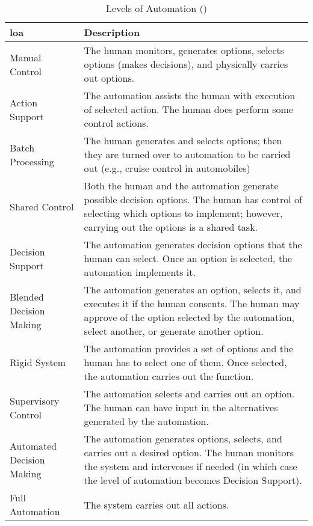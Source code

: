 \begin{table}\centering
  \caption[Levels of Automation]{Levels of Automation (\citet{Endsley1999})}
  \label{tab:autonomy_levels_endsley}
  \begin{tabularx}{\textwidth}{p{3cm} X}\toprule
    \gls{loa} & Description \\ \midrule
    Manual Control &
    The human monitors, generates options, selects options (makes decisions), and physically carries out options.\\
    Action Support &
    The automation assists the human with execution of selected action. The human does perform some control actions.\\
    Batch Processing &
    The human generates and selects options; then they are turned over to automation to be carried out (e.g., cruise control in automobiles)\\
    Shared Control &
    Both the human and the automation generate possible decision options. The human has control of selecting which options to implement; however, carrying out the options is a shared task.\\
    Decision Support &
    The automation generates decision options that the human can select. Once an option is selected, the automation implements it.\\
    Blended Decision Making & 
    The automation generates an option, selects it, and executes it if the human consents. The human may approve of the option selected by the automation, select another, or generate another option.\\
    Rigid System &      
    The automation provides a set of options and the human has to select one of them. Once selected, the automation carries out the function.\\
    Supervisory Control &
    The automation selects and carries out an option. The human can have input in the alternatives generated by the automation.\\
    Automated Decision Making & 
    The automation generates options, selects, and carries out a desired option. The human monitors the system and intervenes if needed (in which case the level of automation becomes Decision Support).\\
    Full Automation &   The system carries out all actions.\\ \bottomrule
  \end{tabularx}
\end{table}



